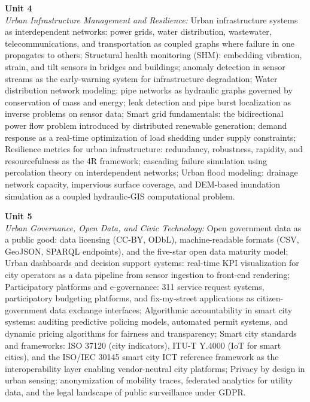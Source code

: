 \noindent\textbf{Unit 4} \\
\textit{Urban Infrastructure Management and Resilience:} Urban infrastructure systems as interdependent networks: power grids, water distribution, wastewater, telecommunications, and transportation as coupled graphs where failure in one propagates to others; Structural health monitoring (SHM): embedding vibration, strain, and tilt sensors in bridges and buildings; anomaly detection in sensor streams as the early-warning system for infrastructure degradation; Water distribution network modeling: pipe networks as hydraulic graphs governed by conservation of mass and energy; leak detection and pipe burst localization as inverse problems on sensor data; Smart grid fundamentals: the bidirectional power flow problem introduced by distributed renewable generation; demand response as a real-time optimization of load shedding under supply constraints; Resilience metrics for urban infrastructure: redundancy, robustness, rapidity, and resourcefulness as the 4R framework; cascading failure simulation using percolation theory on interdependent networks; Urban flood modeling: drainage network capacity, impervious surface coverage, and DEM-based inundation simulation as a coupled hydraulic-GIS computational problem.

\vspace{0.3cm}

\noindent\textbf{Unit 5} \\
\textit{Urban Governance, Open Data, and Civic Technology:} Open government data as a public good: data licensing (CC-BY, ODbL), machine-readable formats (CSV, GeoJSON, SPARQL endpoints), and the five-star open data maturity model; Urban dashboards and decision support systems: real-time KPI visualization for city operators as a data pipeline from sensor ingestion to front-end rendering; Participatory platforms and e-governance: 311 service request systems, participatory budgeting platforms, and fix-my-street applications as citizen-government data exchange interfaces; Algorithmic accountability in smart city systems: auditing predictive policing models, automated permit systems, and dynamic pricing algorithms for fairness and transparency; Smart city standards and frameworks: ISO 37120 (city indicators), ITU-T Y.4000 (IoT for smart cities), and the ISO/IEC 30145 smart city ICT reference framework as the interoperability layer enabling vendor-neutral city platforms; Privacy by design in urban sensing: anonymization of mobility traces, federated analytics for utility data, and the legal landscape of public surveillance under GDPR.

\newpage
{}
